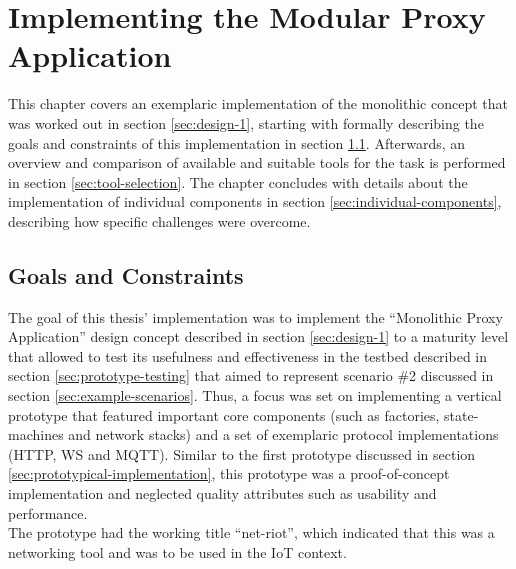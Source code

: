 \chapter{Implementing the Modular Proxy Application}
\label{chap:implementation}
This chapter covers an exemplaric implementation of the monolithic concept that was worked out in section \ref{sec:design-1}, starting with formally describing the goals and constraints of this implementation in section \ref{sec:goals-constraints}. Afterwards, an overview and comparison of available and suitable tools for the task is performed in section \ref{sec:tool-selection}. The chapter concludes with details about the implementation of individual components in section \ref{sec:individual-components}, describing how specific challenges were overcome.%

\section{Goals and Constraints}
\label{sec:goals-constraints}
The goal of this thesis' implementation was to implement the \enquote{Monolithic Proxy Application} design concept described in section \ref{sec:design-1} to a maturity level that allowed to test its usefulness and effectiveness in the testbed described in section \ref{sec:prototype-testing} that aimed to represent scenario \#2 discussed in section \ref{sec:example-scenarios}. Thus, a focus was set on implementing a vertical prototype that featured important core components (such as factories, state-machines and network stacks) and a set of exemplaric protocol implementations (\ac{HTTP}, \ac{WS} and \ac{MQTT}). Similar to the first prototype discussed in section \ref{sec:prototypical-implementation}, this prototype was a proof-of-concept implementation and neglected quality attributes such as usability and performance.\\
The prototype had the working title \enquote{net-riot}, which indicated that this was a networking tool and was to be used in the \ac{IoT} context. %

